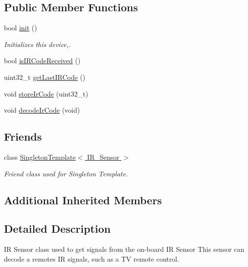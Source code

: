 \subsection*{Public Member Functions}
\begin{DoxyCompactItemize}
\item 
bool \hyperlink{classIR__Sensor_aed070b378b1a8434dc4ef697367b24aa}{init} ()
\begin{DoxyCompactList}\small\item\em Initializes this device,. \end{DoxyCompactList}\item 
bool \hyperlink{classIR__Sensor_a9ab8df4474ccdbf246f2a36aef42afa8}{is\+I\+R\+Code\+Received} ()
\item 
uint32\+\_\+t \hyperlink{classIR__Sensor_a73909031861c829b42eda33aafe330ed}{get\+Last\+I\+R\+Code} ()
\end{DoxyCompactItemize}
{\bf }\par
\begin{DoxyCompactItemize}
\item 
void \hyperlink{classIR__Sensor_a4cb79e3f711d2d374aeb49c601f4a61e}{store\+Ir\+Code} (uint32\+\_\+t)
\item 
void \hyperlink{classIR__Sensor_ade378c1c94b66513c862733b7bb8c163}{decode\+Ir\+Code} (void)
\end{DoxyCompactItemize}

\subsection*{Friends}
\begin{DoxyCompactItemize}
\item 
class \hyperlink{classIR__Sensor_ab53cf421ebbd5018a3e945bb6368f90e}{Singleton\+Template$<$ I\+R\+\_\+\+Sensor $>$}
\begin{DoxyCompactList}\small\item\em Friend class used for Singleton Template. \end{DoxyCompactList}\end{DoxyCompactItemize}
\subsection*{Additional Inherited Members}


\subsection{Detailed Description}
IR Sensor class used to get signals from the on-\/board IR Sensor This sensor can decode a remote\textquotesingle{}s IR signals, such as a TV remote control.

